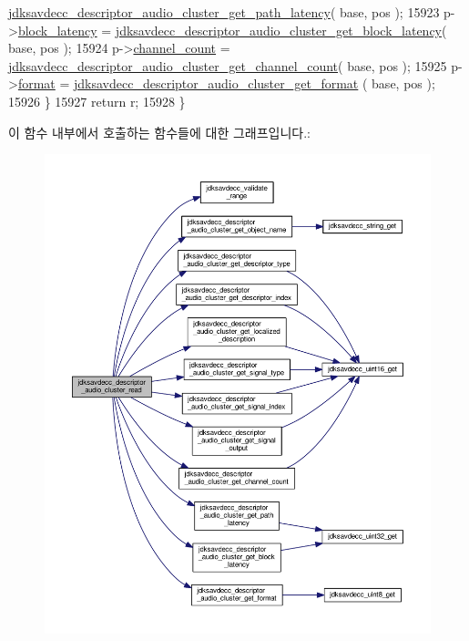 \begin{DoxyCode}
      \hyperlink{group__descriptor__audio__cluster_ga7058fe96d0ed970e15e272ada2c1c091}{jdksavdecc\_descriptor\_audio\_cluster\_get\_path\_latency}( 
      base, pos );
15923         p->\hyperlink{structjdksavdecc__descriptor__audio__cluster_ae2e9f0088d5e900b610d1b2818dfc559}{block\_latency} = 
      \hyperlink{group__descriptor__audio__cluster_ga664f971791a1b29b00c29128fe603bbb}{jdksavdecc\_descriptor\_audio\_cluster\_get\_block\_latency}(
       base, pos );
15924         p->\hyperlink{structjdksavdecc__descriptor__audio__cluster_a1a00ba2b3410e15d86581bf7602b30ac}{channel\_count} = 
      \hyperlink{group__descriptor__audio__cluster_gadc3bb7fe291e49fe10a988cf04fe54af}{jdksavdecc\_descriptor\_audio\_cluster\_get\_channel\_count}(
       base, pos );
15925         p->\hyperlink{structjdksavdecc__descriptor__audio__cluster_a7864fd50d470f893524181b4a59d9828}{format} = \hyperlink{group__descriptor__audio__cluster_gaae354012aa1d2bba4c18044bbd6e55ea}{jdksavdecc\_descriptor\_audio\_cluster\_get\_format}
      ( base, pos );
15926     \}
15927     \textcolor{keywordflow}{return} r;
15928 \}
\end{DoxyCode}


이 함수 내부에서 호출하는 함수들에 대한 그래프입니다.\+:
\nopagebreak
\begin{figure}[H]
\begin{center}
\leavevmode
\includegraphics[width=350pt]{group__descriptor__audio__cluster_ga152f8e529f7032886ba85998e010ed86_cgraph}
\end{center}
\end{figure}


